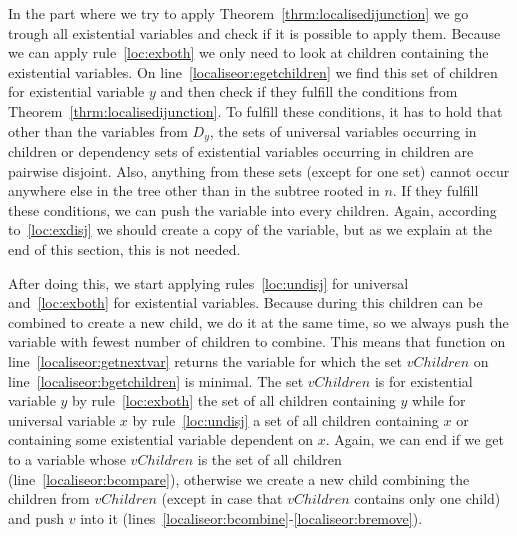 \documentclass[
  digital, %
  color,
  twoside, %
  table,   %
  nolof,     %
  nolot,     %
]{fithesis3}
\theoremstyle{definition}
\theoremstyle{remark}
\begin{document}
In the part where we try to apply Theorem~\ref{thrm:localisedijunction} we go trough all existential variables and check if it is possible to apply them. Because we can apply rule~\eqref{loc:exboth} we only need to look at children containing the existential variables. On line~\ref{localiseor:egetchildren} we find this set of children for existential variable $y$ and then check if they fulfill the conditions from Theorem~\ref{thrm:localisedijunction}. To fulfill these conditions, it has to hold that other than the variables from $D_y$, the sets of universal variables occurring in children or dependency sets of existential variables occurring in children are pairwise disjoint. Also, anything from these sets (except for one set) cannot occur anywhere else in the tree other than in the subtree rooted in $n$. If they fulfill these conditions, we can push the variable into every children. Again, according to~\eqref{loc:exdisj} we should create a copy of the variable, but as we explain at the end of this section, this is not needed.

After doing this, we start applying rules~\eqref{loc:undisj} for universal and~\ref{loc:exboth} for existential variables. Because during this children can be combined to create a new child, we do it at the same time, so we always push the variable with fewest number of children to combine. This means that function  on line~\ref{localiseor:getnextvar} returns the variable for which the set $vChildren$ on line~\ref{localiseor:bgetchildren} is minimal. The set $vChildren$ is for existential variable $y$ by rule~\eqref{loc:exboth} the set of all children containing $y$ while for universal variable $x$ by rule~\ref{loc:undisj} a set of all children containing $x$ or containing some existential variable dependent on $x$. Again, we can end if we get to a variable whose $vChildren$ is the set of all children (line~\ref{localiseor:bcompare}), otherwise we create a new child combining the children from $vChildren$ (except in case that $vChildren$ contains only one child) and push $v$ into it (lines~\ref{localiseor:bcombine}-\ref{localiseor:bremove}).  
\end{document}
